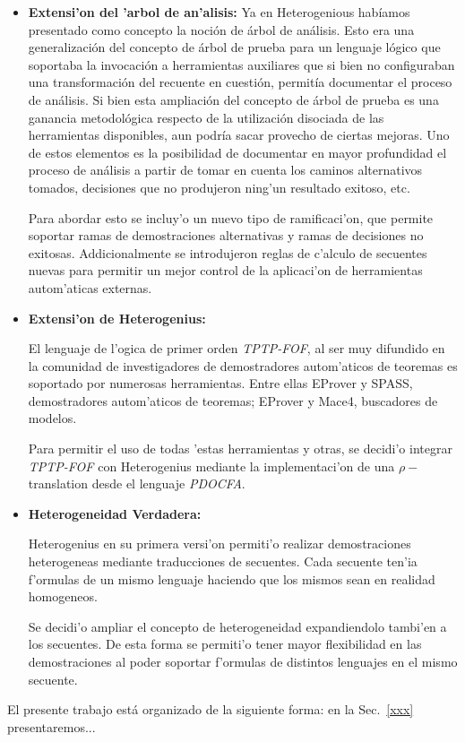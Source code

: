 \begin{itemize}
\item \textbf{Extensi'on del 'arbol de an'alisis:} Ya en Heterogenious habíamos presentado como concepto la noción de árbol de análisis. Esto era una generalización del concepto de árbol de prueba para un lenguaje lógico que soportaba la invocación a herramientas auxiliares que si bien no configuraban una transformación del recuente en cuestión, permitía documentar el proceso de análisis. Si bien esta ampliación del concepto de árbol de prueba es una ganancia metodológica respecto de la utilización disociada de las herramientas disponibles, aun podría sacar provecho de ciertas mejoras. Uno de estos elementos es la posibilidad de documentar en mayor profundidad el proceso de análisis a partir de tomar en cuenta los caminos alternativos tomados, decisiones que no produjeron ning'un resultado exitoso, etc.

Para abordar esto se incluy'o un nuevo tipo de ramificaci'on, que permite soportar ramas de demostraciones alternativas y ramas de decisiones no exitosas. Addicionalmente se introdujeron reglas de c'alculo de secuentes nuevas para permitir un mejor control de la aplicaci'on de herramientas autom'aticas externas. 

\item \textbf{Extensi'on de Heterogenius:}

El lenguaje de l'ogica de primer orden \textit{TPTP-FOF}, al ser muy difundido en la comunidad de investigadores de demostradores autom'aticos de teoremas es soportado por numerosas herramientas. Entre ellas EProver y SPASS, demostradores autom'aticos de teoremas; EProver y Mace4, buscadores de modelos. 

Para permitir el uso de todas 'estas herramientas y otras, se decidi'o integrar \textit{TPTP-FOF} con Heterogenius mediante la implementaci'on de una $\rho-$translation desde el lenguaje \textit{PDOCFA}.


\item \textbf{Heterogeneidad Verdadera:}

Heterogenius en su primera versi'on permiti'o realizar demostraciones heterogeneas mediante traducciones de secuentes. Cada secuente ten'ia f'ormulas de un mismo lenguaje haciendo que los mismos sean en realidad homogeneos.

Se decidi'o ampliar el concepto de heterogeneidad expandiendolo tambi'en a los secuentes. De esta forma se permiti'o tener mayor flexibilidad en las demostraciones al poder soportar f'ormulas de distintos lenguajes en el mismo secuente.

\end{itemize}

El presente trabajo está organizado de la siguiente forma: en la Sec.~\ref{xxx} presentaremos...